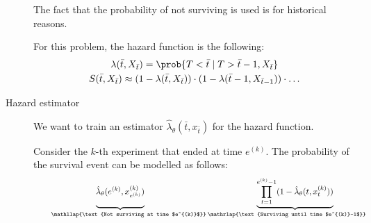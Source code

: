 \begin{description}
        \begin{remark}
            The fact that the probability of not surviving is used is for historical reasons.
        \end{remark}

        For this problem, the hazard function is the following:
        \[ 
            \begin{gathered}
                \lambda(\bar{t}, X_{\bar{t}}) = \prob{T < \bar{t} \mid T > \bar{t}-1, X_{\bar{t}}} \\
                S(\bar{t}, X_{\bar{t}}) \approx (1-\lambda(\bar{t}, X_{\bar{t}})) \cdot (1 - \lambda(\bar{t}-1, X_{\bar{t}-1})) \cdot \dots
            \end{gathered}
        \]

    \item[Hazard estimator]
            We want to train an estimator $\hat{\lambda}_\theta(\bar{t}, x_{\bar{t}})$ for the hazard function.

            Consider the $k$-th experiment that ended at time $e^{(k)}$. The probability of the survival event can be modelled as follows:
            \[
                \underbrace{ 
                    \vphantom{\prod_{t=1}^{e^{(k)}-1}}
                    \hat{\lambda}_\theta(e^{(k)}, x^{(k)}_{e^{(k)}})
                }_{\qquad\mathllap{\text{Not surviving at time $e^{(k)}$}}}
                \underbrace{ 
                    \prod_{t=1}^{e^{(k)}-1} (1 - \hat{\lambda}_\theta(t, x^{(k)}_{t}))
                }_{\mathrlap{\text{Surviving until time $e^{(k)}-1$}}\qquad}
            \]


\end{description}
